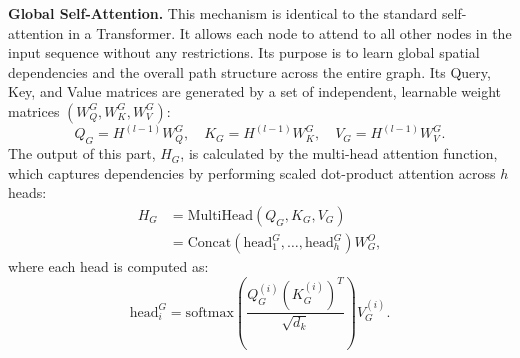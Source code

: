\documentclass[pdflatex,sn-basic,Numbered]{sn-jnl}
\begin{document}
\textbf{Global Self-Attention.} This mechanism is identical to the standard self-attention in a Transformer. It allows each node to attend to all other nodes in the input sequence without any restrictions. Its purpose is to learn global spatial dependencies and the overall path structure across the entire graph. Its Query, Key, and Value matrices are generated by a set of independent, learnable weight matrices $(W_Q^G, W_K^G, W_V^G)$:
\begin{equation}
    Q_G = H^{(l-1)}W_Q^G, \quad K_G = H^{(l-1)}W_K^G, \quad V_G = H^{(l-1)}W_V^G.
\end{equation}
The output of this part, $H_G$, is calculated by the multi-head attention function, which captures dependencies by performing scaled dot-product attention across $h$ heads:
\begin{equation}
\begin{split}
    H_G &= \text{MultiHead}(Q_G, K_G, V_G) \\
        &= \text{Concat}(\text{head}_1^G, \dots, \text{head}_h^G)W^O_G,
\end{split}
\end{equation}
where each head is computed as:
\begin{equation}
    \text{head}_i^G = \text{softmax}\left(\frac{Q_G^{(i)}(K_G^{(i)})^T}{\sqrt{d_k}}\right)V_G^{(i)}.
\end{equation}
\end{document}
